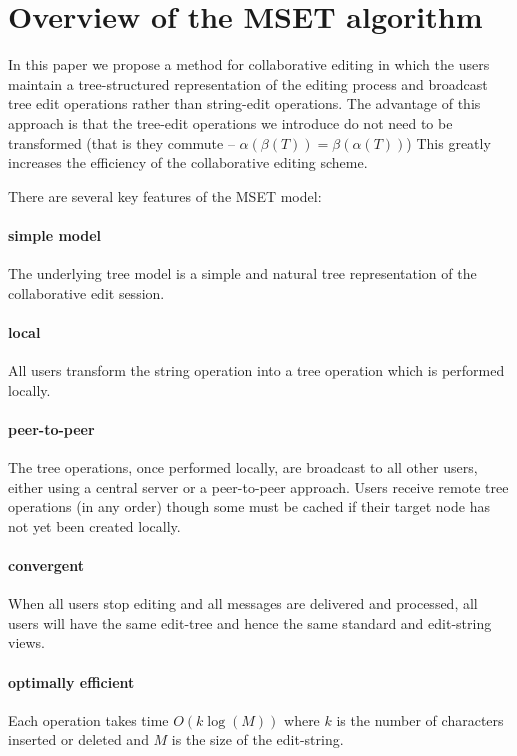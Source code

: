 \documentclass{amsart}
\begin{document}
\section{Overview of the MSET algorithm}

In this paper we propose a method for collaborative editing in which the
users maintain a tree-structured representation of the editing process and
broadcast tree edit operations rather than string-edit operations. The advantage
of this approach is that the tree-edit operations we introduce do not need to be transformed
(that is they commute -- $\alpha(\beta(T)) = \beta(\alpha(T))$) This greatly increases
the efficiency of the collaborative editing scheme. 


There are several key features of the MSET model:

\paragraph{\bf simple model}
The underlying tree model is a simple and natural tree representation
of the collaborative edit session.

\paragraph{\bf local}
All users transform the string operation into a tree operation
which is performed locally.

\paragraph{\bf peer-to-peer}
The tree operations, once performed locally, are broadcast
to all other users, either using a central server or a peer-to-peer approach.
Users receive remote tree operations (in any order) though some must
be cached if their target node has not yet been created locally.

\paragraph{\bf convergent} 
When all users stop editing and all messages are delivered and processed, all
users will have the same edit-tree and hence the same standard and edit-string
views.

\paragraph{\bf optimally efficient}
Each operation takes time $O(k\log(M))$ where $k$ is the number of characters
inserted or deleted and $M$ is the size of the edit-string.
\end{document}
